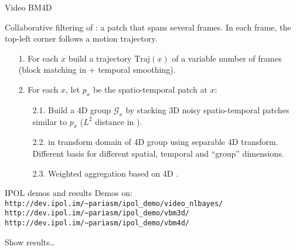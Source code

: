\documentclass[mathserif]{beamer}
\makeatletter
\newcounter{multipleslide}
\newcommand{\restoreframe}{%
\patchcmd{\beamer@@tmpl@footline}%
	{\themultipleslide}%
	{\insertframenumber}%
	{}%
	{}%
\setcounter{framenumber}{\value{multipleslide}}%
}
\makeatother
\begin{document}
\begin{frame}{Video BM4D}

	Collaborative filtering of : a patch
	that spans several frames. In each frame, the top-left corner follows a
	motion trajectory.


	\vspace{.6cm}
	
	\begin{enumerate} \itemsep=.5cm
		\item[1.] For each $x$ build a trajectory $\text{Traj}(x)$ of a variable
			number of frames (block matching in  $+$ temporal smoothing).
		\item[2.] For each $x$, let $p_x$ be the spatio-temporal patch at $x$:
			\begin{enumerate} \itemsep=.2cm
				\item[2.1.] Build a 4D group $\mathcal G_x$ by stacking 3D noisy
					spatio-temporal patches similar to $p_x$ ($L^2$ distance in
					).
				\item[2.2.]  in transform domain of 4D
					group using separable 4D transform. Different basis for
					different spatial, temporal and ``group'' dimensions.
				\item[2.3.] Weighted aggregation based on 4D .
			\end{enumerate}
	\end{enumerate}

\end{frame}
\restoreframe

\begin{frame}[fragile]{IPOL demos and results}
	Demos on:\\
	\verb+http://dev.ipol.im/~pariasm/ipol_demo/video_nlbayes/+\\
	\verb+http://dev.ipol.im/~pariasm/ipol_demo/vbm3d/+\\
	\verb+http://dev.ipol.im/~pariasm/ipol_demo/vbm4d/+

	\vspace{2cm}

	Show results\dots

\end{frame}
\end{document}
